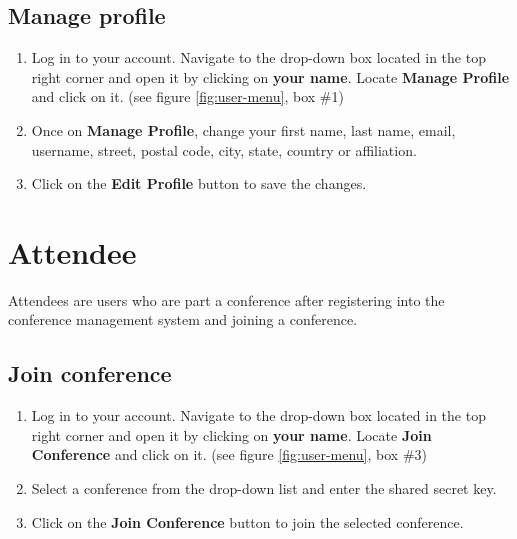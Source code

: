 \documentclass[nochapterpage,nopartpage,noheadingspace,numbersubsubsec,bigchapter,colorback,accentcolor=tud9c,10pt]{tudreport}
\begin{document}
	\section{Manage profile}


\begin{enumerate}
	\item	Log in to your account. Navigate to the drop-down box located in the top right corner and open it by clicking on \textbf{your name}. Locate \textbf{Manage Profile} and click on it. (see figure \ref{fig:user-menu}, box \#1)
	\item	Once on \textbf{Manage Profile}, change your first name, last name, email, username, street, postal code, city, state, country or affiliation.
	\item	Click on the \textbf{Edit Profile} button to save the changes.
\end{enumerate}



  \chapter{Attendee}

Attendees are users who are part a conference after registering into the conference management system and joining a conference.

	\section{Join conference}


\begin{enumerate}
	\item	Log in to your account. Navigate to the drop-down box located in the top right corner and open it by clicking on \textbf{your name}. Locate  \textbf{Join Conference} and click on it. (see figure \ref{fig:user-menu}, box \#3)
	\item	Select a conference from the drop-down list and enter the shared secret key.
	\item	Click on the \textbf{Join Conference} button to join the selected conference.
\end{enumerate}
\end{document}
